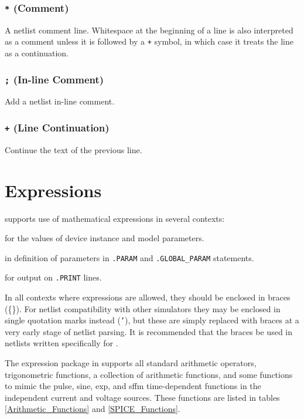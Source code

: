 \subsubsection{\texttt{*} (Comment)}
 A netlist comment line.  Whitespace at
the beginning of a line is also interpreted as a comment unless it
is followed by a \verb|+| symbol, in which case it treats the line as a continuation.

\subsubsection{\texttt{;} (In-line Comment)}
 Add a netlist in-line comment.

\subsubsection{\texttt{+} (Line Continuation)}
 Continue the text of the previous line.

\newpage
\section{Expressions}
\label{ExpressionDocumentation}
\Xyce{} supports use of mathematical expressions in several contexts:
\begin{XyceItemize}
\item for the values of device instance and model parameters.
\item in definition of parameters in \texttt{.PARAM} and \texttt{.GLOBAL\_PARAM} statements.
\item for output on \texttt{.PRINT} lines.
\end{XyceItemize}

In all contexts where expressions are allowed, they should be enclosed
in braces (\{\}).  For netlist compatibility with other simulators
they may be enclosed in single quotation marks instead (\texttt{'}),
but these are simply replaced with braces at a very early stage of
netlist parsing.  It is recommended that the braces be used in
netlists written specifically for \Xyce{}.

The expression package in \Xyce{} supports all standard arithmetic
operators, trigonometric functions, a collection of arithmetic
functions, and some functions to mimic the pulse, sine, exp, and sffm
time-dependent functions in the independent current and voltage sources.
These functions are listed in tables \ref{Arithmetic_Functions} and
\ref{SPICE_Functions}.

